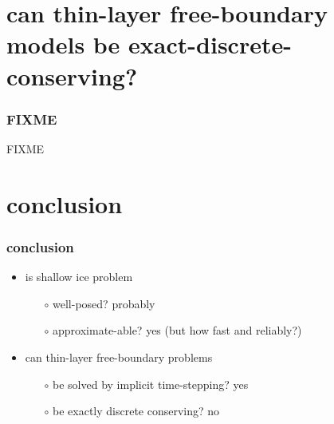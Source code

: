 \documentclass[hide notes,intlimits]{beamer}
\begin{document}
\section[conservation w free boundaries?]{can thin-layer free-boundary models be exact-discrete-conserving?}

\begin{frame}
  \frametitle{FIXME} 

FIXME
\end{frame}


\section*{conclusion}

\begin{frame}
  \frametitle{conclusion}

\begin{itemize}
\item is shallow ice problem
  \begin{itemize}
  \item[$\circ$] well-posed? \qquad \alert{probably}
  \item[$\circ$] approximate-able? \qquad \alert{yes} (but how fast and reliably?)
  \end{itemize}
\item can thin-layer free-boundary problems
  \begin{itemize}
  \item[$\circ$] be solved by implicit time-stepping? \qquad \alert{yes}
  \item[$\circ$] be exactly discrete conserving? \qquad \alert{no}
  \end{itemize}
\end{itemize}
\end{frame}
\end{document}
